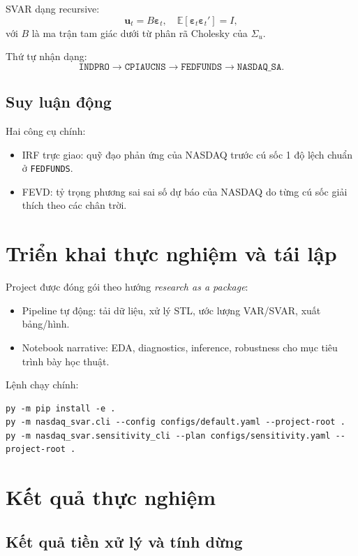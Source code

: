 \documentclass[12pt,a4paper]{article}
\begin{document}
SVAR dạng recursive:
\begin{equation}
\bm{u}_t = B \bm{\varepsilon}_t,\quad \mathbb{E}[\bm{\varepsilon}_t\bm{\varepsilon}_t']=I,
\end{equation}
với \(B\) là ma trận tam giác dưới từ phân rã Cholesky của \(\Sigma_u\).

Thứ tự nhận dạng:
\[
\texttt{INDPRO} \rightarrow \texttt{CPIAUCNS} \rightarrow \texttt{FEDFUNDS} \rightarrow \texttt{NASDAQ\_SA}.
\]

\subsection{Suy luận động}

Hai công cụ chính:
\begin{itemize}[leftmargin=1.5em]
    \item IRF trực giao: quỹ đạo phản ứng của NASDAQ trước cú sốc 1 độ lệch chuẩn ở \texttt{FEDFUNDS}.
    \item FEVD: tỷ trọng phương sai sai số dự báo của NASDAQ do từng cú sốc giải thích theo các chân trời.
\end{itemize}

\section{Triển khai thực nghiệm và tái lập}

Project được đóng gói theo hướng \textit{research as a package}:
\begin{itemize}[leftmargin=1.5em]
    \item Pipeline tự động: tải dữ liệu, xử lý STL, ước lượng VAR/SVAR, xuất bảng/hình.
    \item Notebook narrative: EDA, diagnostics, inference, robustness cho mục tiêu trình bày học thuật.
\end{itemize}

Lệnh chạy chính:
\begin{verbatim}
py -m pip install -e .
py -m nasdaq_svar.cli --config configs/default.yaml --project-root .
py -m nasdaq_svar.sensitivity_cli --plan configs/sensitivity.yaml --project-root .
\end{verbatim}

\section{Kết quả thực nghiệm}

\subsection{Kết quả tiền xử lý và tính dừng}
\end{document}

